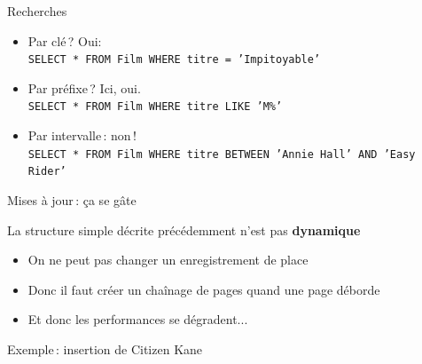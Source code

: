 \begin{frame}{Recherches}

\begin{itemize}
  \item Par clé\,? Oui:\\
     \texttt{SELECT * FROM  Film WHERE titre = 'Impitoyable'}

   \item Par préfixe\,? Ici, oui.\\
      \texttt{SELECT * FROM  Film WHERE titre LIKE 'M\%'}

   \item Par intervalle\,: non\,!\\

\texttt{SELECT *
FROM  Film
WHERE titre BETWEEN 'Annie Hall' AND 'Easy Rider'}
  
\end{itemize}

\end{frame}
\begin{frame}{Mises à jour\,: ça se gâte}

La structure simple décrite précédemment n'est pas
\textbf{dynamique}
\begin{itemize}
  \item On ne peut pas changer un enregistrement de place

   \item Donc  il faut créer un chaînage de pages quand
             une page déborde

  \item Et donc les performances se dégradent...
\end{itemize}

\end{frame}
\begin{frame}{Exemple\,: insertion de Citizen Kane}


\end{frame}

